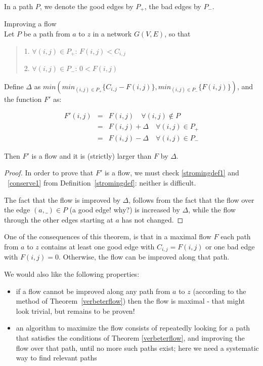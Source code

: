 In a path $P$, we denote the good edges by $P_{+}$, the bad edges by $P_{-}$.


 \begin{theorem} Improving a flow
\label{verbeterflow}\\
Let $P$ be a path from $a$ to $z$ in a network $G(V,E)$, so that
\begin{verse}
1.
$\forall (i,j) \in P_{+}$: $F(i,j) < C_{i,j}$

2.
$\forall (i,j) \in P_{-}$: $0 < F(i,j)$
\end{verse}

Define $\Delta$ as $min(min_{(i,j) \in P_{+}}
\{C_{i,j}-F(i,j)\},min_{(i,j) \in P_{-}} \{F(i,j)\})$, and the
function $F'$ as:

\begin{eqnarray*}
F'(i,j) & = & F(i,j) \quad \forall (i,j) \notin P\\
        & = & F(i,j) + \Delta \quad \forall (i,j) \in P_{+}\\
        & = & F(i,j) - \Delta \quad \forall (i,j) \in P_{-}
\end{eqnarray*}

Then $F'$ is a flow and it is (strictly) larger than $F$ by $\Delta$.

\end{theorem}
\begin{proof} In order to prove that $F'$ is a flow, we must check
\ref{stromingdef1} and ~\ref{conserve1} from
Definition~\ref{stromingdef}: neither is difficult.

The fact that the flow is improved by $\Delta$, follows from the fact
that the flow over the edge $(a,\_) \in P$ (a good edge! why?) is
increased by $\Delta$, while the flow through the other edges starting
at $a$ has not changed. \end{proof}

One of the consequences of this theorem, is that in a maximal flow $F$
each path from $a$ to $z$ contains at least one good edge with
$C_{i,j} = F(i,j)$ or one bad edge with $F(i,j) = 0$. Otherwise, the
flow can be improved along that path.

We would also like the following properties:

\begin{itemize}
\item
if a flow cannot be improved along any path from $a$ to $z$ (according
to the method of Theorem~\ref{verbeterflow}) then the flow is maximal
- that might look trivial, but remains to be proven!
\item
an algorithm to maximize the flow consists of repeatedly looking for a
path that satisfies the conditions of Theorem \ref{verbeterflow},
and improving the flow over that path, until no more such paths exist;
here we need a systematic way to find relevant paths
\end{itemize}

